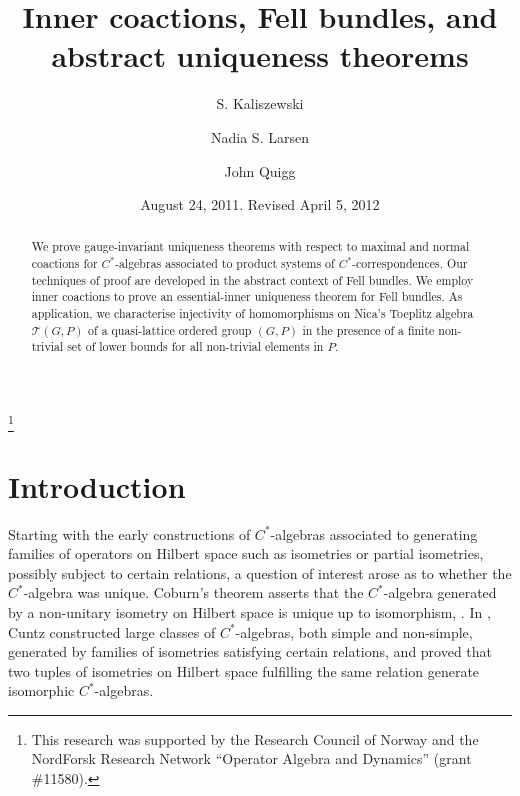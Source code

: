 \documentclass[12pt]{amsart}
\theoremstyle{plain}
\theoremstyle{remark}
\theoremstyle{definition}
\numberwithin{equation}{section}
\theoremstyle{plain}
\theoremstyle{definition}
\theoremstyle{remark}
\begin{document}
\title[Inner coactions, Fell bundles, and abstract uniqueness]{Inner coactions, Fell bundles, and abstract uniqueness theorems}
\author[S. Kaliszewski]{S. Kaliszewski}
\address{School of Mathematical and Statistical Sciences, Arizona State University, Tempe, Arizona, 85287}
\author[N.S. Larsen]{Nadia S. Larsen}
\address{Department of Mathematics, University of Oslo, PO BOX 1053 Blindern, N-
0316 Oslo, Norway.}
\author[J. Quigg]{John Quigg}
\address{School of Mathematical and Statistical Sciences, Arizona State University, Tempe, Arizona, 85287}

\thanks{This research was supported by the Research Council of Norway and the
NordForsk Research Network ``Operator Algebra and Dynamics'' (grant \#11580).}



\begin{abstract}{We prove gauge-invariant uniqueness theorems with respect to maximal and normal coactions
for $C^*$-algebras associated to product systems of $C^*$-correspondences. Our techniques of proof are developed in the abstract context of
Fell bundles. We employ inner coactions to prove an essential-inner uniqueness
theorem for Fell bundles. As application, we characterise injectivity of homomorphisms on Nica's Toeplitz algebra
${\mathcal T}(G, P)$ of a quasi-lattice ordered group $(G, P)$ in the presence of a finite non-trivial
set of lower bounds for all non-trivial elements in $P$.}
\end{abstract}

\date{August 24, 2011. Revised April 5, 2012}
\maketitle

\section{Introduction}\label{intro}

Starting with the early constructions of $C^*$-algebras associated to generating families of operators on Hilbert space
such as isometries or partial isometries, possibly subject to certain relations,
a question of interest arose as to whether the $C^*$-algebra was unique. Coburn's theorem asserts that the $C^*$-algebra
generated by a non-unitary isometry on Hilbert space is unique up to isomorphism, \cite{Co}. In \cite{Cu}, Cuntz constructed
large classes of $C^*$-algebras, both simple and non-simple, generated by families of isometries satisfying certain relations, and proved that
two tuples of isometries on Hilbert space fulfilling the same relation generate isomorphic $C^*$-algebras.
\end{document}
